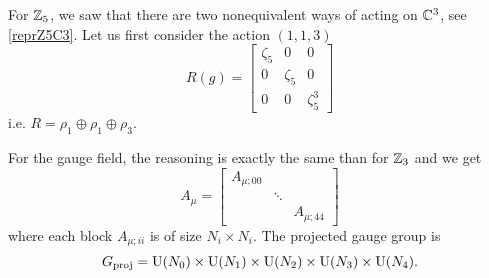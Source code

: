 \documentclass[a4paper,10pt]{article}
\begin{document}
            For $\mathbb{Z}_5$, we saw that there are two nonequivalent ways of acting on $\mathbb{C}^3$, see \eqref{reprZ5C3}. Let us first consider the action $(1,1,3)$
            \begin{equation}
                R(g)=
                \begin{bmatrix}
                    \zeta_5 & 0 & 0\\
                    0 & \zeta_5 & 0\\
                    0 & 0 & \zeta^3_5
                \end{bmatrix}
            \end{equation}
            i.e. $R=\rho_1\oplus\rho_1\oplus\rho_3$.

            For the gauge field, the reasoning is exactly the same than for $\mathbb{Z}_3$ and we get
            \begin{equation}
                A_\mu=
                \begin{bmatrix}
                    A_{\mu;00} & & \\
                    & \ddots & \\
                    & & A_{\mu;44}
                \end{bmatrix}
            \end{equation}
            where each block $A_{\mu;ii}$ is of size $N_i\times N_i$. The projected gauge group is
            \begin{equation}
                G_{\text{proj}} = \text{U}(N_0)\times\text{U}(N_1)\times\text{U}(N_2)\times\text{U}(N_3)\times\text{U}(N_4).
            \end{equation}
\end{document}
